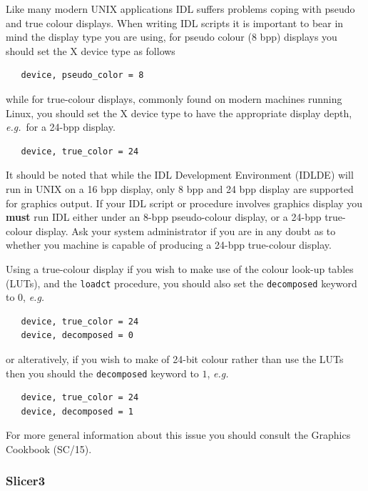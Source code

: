 \documentclass[twoside,11pt]{article}
\newcommand{\xref}[3]{#1}
\begin{document}
\begin{\htmlonly}
{Like many modern UNIX applications IDL suffers problems coping with
pseudo and true colour displays.  When writing IDL scripts it is
important to bear in mind the display type you are using, for pseudo
colour (8 bpp) displays you should set the X device type as follows

\small\begin{verbatim}
   device, pseudo_color = 8
\end{verbatim}\normalsize

while for true-colour displays, commonly found on modern machines
running Linux, you should set the X device type to have the
appropriate display depth, \emph{e.g.}\ for a 24-bpp display.

\small\begin{verbatim}
   device, true_color = 24
\end{verbatim}\normalsize

It should be noted that while the IDL Development Environment (IDLDE)
will run in UNIX on a 16 bpp display, only 8 bpp and 24 bpp display
are supported for graphics output.  If your IDL script or procedure
involves graphics display you {\bf must} run IDL either under an 8-bpp
pseudo-colour display, or a 24-bpp true-colour display.  Ask your
system administrator if you are in any doubt as to whether you machine
is capable of producing a 24-bpp true-colour display.

Using a true-colour display if you wish to make use of the colour
look-up tables (LUTs), and the {\tt loadct} procedure, you should also
set the {\tt decomposed} keyword to $0$, \emph{e.g.}\

\small\begin{verbatim}
   device, true_color = 24
   device, decomposed = 0
\end{verbatim}\normalsize

or alteratively, if you wish to make of 24-bit colour rather than use
the LUTs then you should the {\tt decomposed} keyword to $1$,
\emph{e.g.}\

\small\begin{verbatim}
   device, true_color = 24
   device, decomposed = 1
\end{verbatim}\normalsize

For more general information about this issue you should consult the
\xref{Graphics Cookbook}{sc15}{sc15_display} (SC/15).

\subsubsection{Slicer3}

}
\end{\htmlonly}
\end{document}
